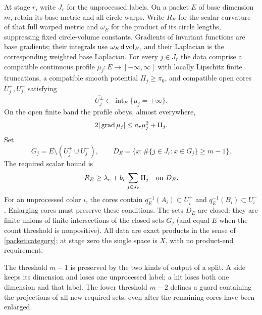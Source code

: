 \begin{definition}\label{packet:invariant}
At stage $r$, write $J_r$ for the unprocessed labels.  On a packet $E$
of base dimension $m$, retain its base metric and all circle warps.
Write $R_E$ for the scalar curvature of that full warped metric and
$\omega_E$ for the product of its circle lengths, suppressing fixed
circle-volume constants.  Gradients of invariant functions are base
gradients; their integrals use $\omega_E\,\mathrm d\operatorname{vol}_E$, and their
Laplacian is the corresponding weighted base Laplacian.
For every $j\in J_r$ the data comprise a compatible continuous profile
$\mu_j:E\to[-\infty,\infty]$ with locally Lipschitz finite truncations,
a compatible smooth potential $\Pi_j\ge\pi_0$, and compatible open
cores $U_j^+,U_j^-$ satisfying
\begin{equation}\label{packet:core-poles}
 \overline{U_j^\pm}\subset
 \operatorname{int}_E\{\mu_j=\pm\infty\}.
\end{equation}
On the open finite band the profile obeys, almost everywhere,
\begin{equation}\label{packet:profile}
 2|\operatorname{grad}\mu_j|\le a_r\mu_j^2+\Pi_j.
\end{equation}
Set
\begin{equation}\label{packet:required-set}
 G_j=E\setminus(U_j^+\cup U_j^-),\qquad
 D_E=\bigl\{x:\#\{j\in J_r:x\in G_j\}\ge m-1\bigr\}.
\end{equation}
The required scalar bound is
\begin{equation}\label{packet:curvature}
 R_E\ge\lambda_r+b_r\sum_{j\in J_r}\Pi_j
       \quad\hbox{on }D_E.
\end{equation}
For an unprocessed color $i$, the cores contain
$q_E^{-1}(A_i)\subset U_i^+$ and
$q_E^{-1}(B_i)\subset U_i^-$.  Enlarging cores must preserve these
conditions.  The sets $D_E$ are closed: they are finite unions of finite intersections
of the closed sets $G_j$ (and equal $E$ when the count threshold is
nonpositive).  All data are exact products
in the sense of \cref{packet:category}; at stage zero the single
space is $X$, with no product-end requirement.
\end{definition}

The threshold $m-1$ is preserved by the two kinds of output of a
split. A side keeps its dimension and loses one unprocessed label;
a hit loses both one dimension and that label. The lower threshold
$m-2$ defines a guard containing the projections of all new required
sets, even after the remaining cores have been enlarged.

